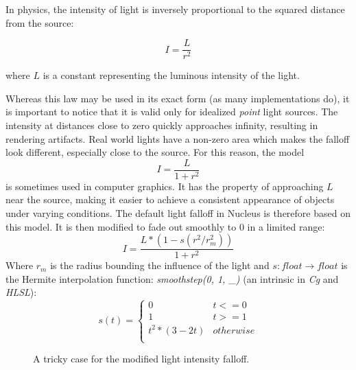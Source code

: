 In physics, the intensity of light is inversely proportional to the squared distance from the source:
	
\[
	I = \frac{L}{r^2}
\]

where $L$ is a constant representing the luminous intensity of the light.

Whereas this law may be used in its exact form (as many implementations do), it is important to notice that it is valid only for idealized \emph{point} light sources. The intensity at distances close to zero quickly approaches infinity, resulting in rendering artifacts. Real world lights have a non-zero area which makes the falloff look different, especially close to the source. For this reason, the model
\[
	I = \frac{L}{1 + r^2}
\]
is sometimes used in computer graphics. It has the property of approaching $L$ near the source, making it easier to achieve a consistent appearance of objects under varying conditions. The default light falloff in Nucleus is therefore based on this model. It is then modified to fade out smoothly to $0$ in a limited range:
\[
	I = \frac{L * (1 - s(r^2 / r_m^2))}{1 + r^2}
\]
Where $r_m$ is the radius bounding the influence of the light and $s : float \rightarrow float$ is the Hermite interpolation function: \emph{smoothstep(0, 1, \_)} (an intrinsic in \emph{Cg} and \emph{HLSL}):
\[
	s(t) =
	\begin{cases}
	0 & t <= 0 \\
	1 & t >= 1 \\
	t^2 * (3 - 2t) & otherwise \\
	\end{cases}
\]

\begin{figure}[ht!]
  \centering
  \caption[Modified falloff, tricky case]{A tricky case for the modified light intensity falloff.}
\label{fig:lppFalloffTrickyCase}
\end{figure}

